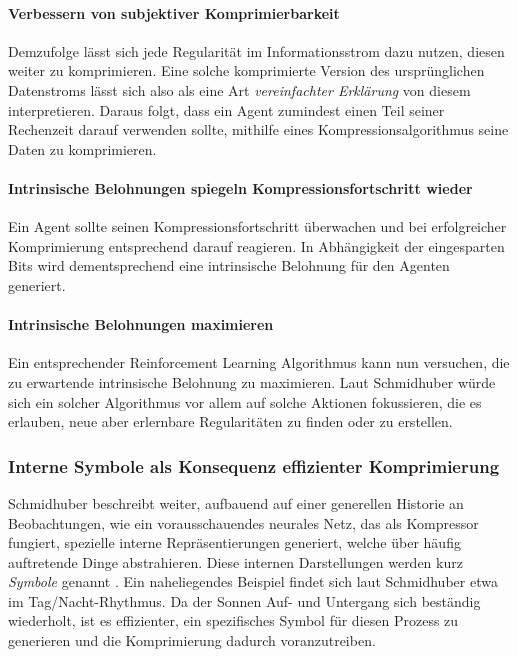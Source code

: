 \paragraph{Verbessern von subjektiver Komprimierbarkeit}
\label{sec:Komprimierbarkeit_verbessern}
Demzufolge lässt sich jede Regularität im Informationsstrom dazu nutzen, diesen weiter zu komprimieren. Eine solche komprimierte Version des ursprünglichen Datenstroms lässt sich also als eine Art \emph{vereinfachter Erklärung} von diesem interpretieren. Daraus folgt, dass ein Agent zumindest einen Teil seiner Rechenzeit darauf verwenden sollte, mithilfe eines Kompressionsalgorithmus seine Daten zu komprimieren.

\paragraph{Intrinsische Belohnungen spiegeln Kompressionsfortschritt wieder}
Ein Agent sollte seinen Kompressionsfortschritt überwachen und bei erfolgreicher Komprimierung entsprechend darauf reagieren. In Abhängigkeit der eingesparten Bits wird dementsprechend eine intrinsische Belohnung für den Agenten generiert.

\paragraph{Intrinsische Belohnungen maximieren}
Ein entsprechender Reinforcement Learning Algorithmus kann nun versuchen, die zu erwartende intrinsische Belohnung zu maximieren. Laut Schmidhuber würde sich ein solcher Algorithmus vor allem auf solche Aktionen fokussieren, die es erlauben, neue aber erlernbare Regularitäten zu finden oder zu erstellen.

\subsubsection{Interne Symbole als Konsequenz effizienter Komprimierung}
Schmidhuber beschreibt weiter, aufbauend auf einer generellen Historie an Beobachtungen, wie ein vorausschauendes neurales Netz, das als Kompressor fungiert, spezielle interne Repräsentierungen generiert, welche über häufig auftretende Dinge abstrahieren. Diese internen Darstellungen werden kurz \emph{Symbole} genannt \cite[p.~6]{curiosity_schmidhuber}. Ein naheliegendes Beispiel findet sich laut Schmidhuber etwa im Tag/Nacht-Rhythmus. Da der Sonnen Auf- und Untergang sich beständig wiederholt, ist es effizienter, ein spezifisches Symbol für diesen Prozess zu generieren und die Komprimierung dadurch voranzutreiben.

